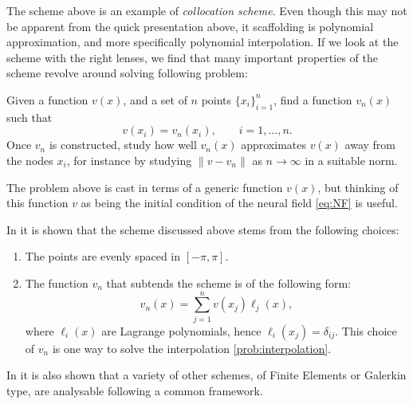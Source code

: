 \documentclass[a4paper]{siamart190516}
\begin{document}
The scheme above is an example of \textit{collocation scheme}. Even though this may
not be apparent from the quick presentation above, it scaffolding is polynomial
approximation, and more specifically polynomial interpolation. If we
look at the scheme with the right lenses, we find that many important properties of
the scheme revolve around solving following problem: 
\begin{problem}\label{prob:interpolation}
Given a function $v(x)$, and a set of $n$ points $\{ x_i \}_{i=1}^n$, find a function
$v_n(x)$ such that 
\[
  v(x_i) = v_n(x_i), \qquad i = 1,\ldots, n.
\]  
Once $v_n$ is constructed, study how well $v_n(x)$ approximates $v(x)$ away from the
nodes $x_i$, for instance by studying $\| v - v_n \|$ as $n \to \infty$ in a suitable
norm.
\end{problem}
The problem above is cast in terms of a generic function $v(x)$, but thinking of this
function $v$ as being the initial condition of the neural field \cref{eq:NF} is
useful.

In \cite{Avitabile:2023ab} it is shown that the scheme discussed
above stems from the following choices: 
\begin{enumerate}
  \item The points are evenly spaced in $[-\pi,\pi]$.
  \item The function $v_n$ that subtends the scheme is of the following form:
    \begin{equation}\label{eq:LagrangeInterp}
      v_n(x) = \sum_{j=1}^{n} v(x_j) \ell_j(x), 
    \end{equation}
    where $\ell_i(x)$ are Lagrange polynomials, hence $\ell_i(x_j) = \delta_{ij}$.
    This choice of $v_n$ is one way to solve the interpolation
    \cref{prob:interpolation}.
\end{enumerate}
In \cite{Avitabile:2023ab} it is also shown that a variety of
other schemes, of Finite Elements or Galerkin type, are analysable following a common
framework.
\end{document}
